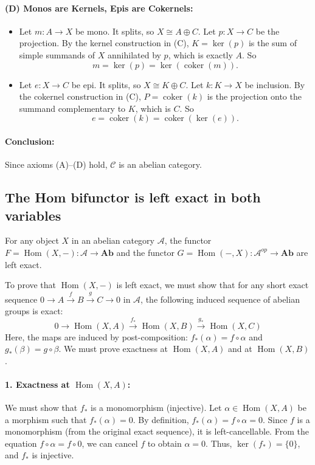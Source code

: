 \documentclass[11pt]{article}
\theoremstyle{definition}
\begin{document}
\paragraph{(D) Monos are Kernels, Epis are Cokernels:}
\begin{itemize}
  \item Let \(m: A \to X\) be mono. It splits, so \(X \cong A \oplus C\). Let \(p: X \to C\) be the projection. By the kernel construction in (C), \(K = \ker(p)\) is the sum of simple summands of \(X\) annihilated by \(p\), which is exactly \(A\). So 
  \[
    m = \ker(p) = \ker(\operatorname{coker}(m)).
  \]
  \item Let \(e: X \to C\) be epi. It splits, so \(X \cong K \oplus C\). Let \(k: K \to X\) be inclusion. By the cokernel construction in (C), \(P = \operatorname{coker}(k)\) is the projection onto the summand complementary to \(K\), which is \(C\). So 
  \[
    e = \operatorname{coker}(k) = \operatorname{coker}(\ker(e)).
  \]
\end{itemize}

\paragraph{Conclusion:} Since axioms (A)--(D) hold, \(\mathcal{C}\) is an abelian category.


\subsection{The Hom bifunctor is left exact in both variables}

For any object $X$ in an abelian category $\mathcal{A}$, the  functor    $F=\operatorname{Hom}(X, -): \mathcal{A} \to \mathbf{Ab}$ and the functor $G = \operatorname{Hom}( -, X): \mathcal{A}^{op} \to \mathbf{Ab}$ are left exact.

To prove that $\operatorname{Hom}(X, -)$ is left exact, we must show that for any short exact sequence $0 \to A \xrightarrow{f} B \xrightarrow{g} C \to 0$ in $\mathcal{A}$, the following induced sequence of abelian groups is exact:
\[
0 \to \operatorname{Hom}(X, A) \xrightarrow{f_*} \operatorname{Hom}(X, B) \xrightarrow{g_*} \operatorname{Hom}(X, C)
\]
Here, the maps are induced by post-composition: $f_*(\alpha) = f \circ \alpha$ and $g_*(\beta) = g \circ \beta$. We must prove exactness at $\operatorname{Hom}(X, A)$ and at $\operatorname{Hom}(X, B)$.

\paragraph{1. Exactness at $\operatorname{Hom}(X, A)$:} We must show that $f_*$ is a monomorphism (injective).
Let $\alpha \in \operatorname{Hom}(X, A)$ be a morphism such that $f_*(\alpha) = 0$. By definition, $f_*(\alpha) = f \circ \alpha = 0$. Since $f$ is a monomorphism (from the original exact sequence), it is left-cancellable. From the equation $f \circ \alpha = f \circ 0$, we can cancel $f$ to obtain $\alpha = 0$. Thus, $\ker(f_*) = \{0\}$, and $f_*$ is injective.
\end{document}
